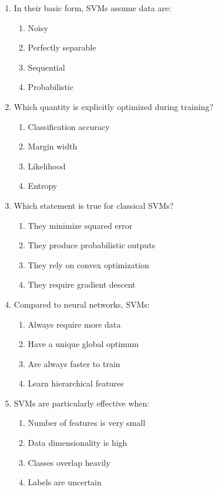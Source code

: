 \documentclass{article}
\begin{document}
\begin{enumerate}
		\item In their basic form, SVMs assume data are:
		\begin{enumerate}
			\item Noisy
			\item Perfectly separable
			\item Sequential
			\item Probabilistic
		\end{enumerate}
		
		\item Which quantity is explicitly optimized during training?
		\begin{enumerate}
			\item Classification accuracy
			\item Margin width
			\item Likelihood
			\item Entropy
		\end{enumerate}
		
		\item Which statement is true for classical SVMs?
		\begin{enumerate}
			\item They minimize squared error
			\item They produce probabilistic outputs
			\item They rely on convex optimization
			\item They require gradient descent
		\end{enumerate}
		
		\item Compared to neural networks, SVMs:
		\begin{enumerate}
			\item Always require more data
			\item Have a unique global optimum
			\item Are always faster to train
			\item Learn hierarchical features
		\end{enumerate}
		
		\item SVMs are particularly effective when:
		\begin{enumerate}
			\item Number of features is very small
			\item Data dimensionality is high
			\item Classes overlap heavily
			\item Labels are uncertain
		\end{enumerate}
	\end{enumerate}
	
\end{document}
